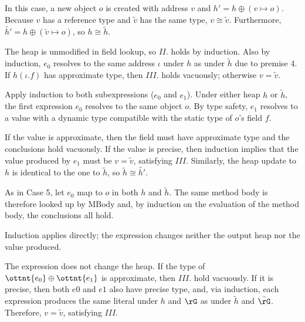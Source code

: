 In this case, a new
object $o$ is created with address $v$ and
$h' = h \oplus (v \mapsto o)$. Because $v$ has a reference type and $\tilde{v}$
has the same type, $v \cong \tilde{v}$. Furthermore,
$\tilde{h'} = h \oplus (\tilde{v} \mapsto o)$, so $h \cong \tilde{h}$.


The heap is unmodified in field lookup, so $II.$ holds by induction. Also by
induction, $e_0$ resolves to the same address $\iota$ under $h$ as under
$\tilde{h}$ due to premise 4. If $h(\iota.f)$ has approximate type,
then $III.$ holds vacuously; otherwise $v = \tilde{v}$.


Apply induction to both subexpressions ($e_0$ and $e_1$). Under either heap $h$
or $\tilde{h}$, the first expression $e_0$ resolves to the same object $o$. By
type safety, $e_1$ resolves to a value with a dynamic type compatible
with the static type of $o$'s field $f$.

If the value is approximate, then the field must have approximate type and the
conclusions hold vacuously. If the value is precise, then induction implies that
the value produced by $e_1$ must be $v = \tilde{v}$, satisfying $III.$
Similarly, the heap update to $h$ is identical to the one to $\tilde{h}$, so
$\tilde{h} \cong \tilde{h'}$.


As in Case 5, let $e_0$ map to $o$ in both $h$ and $\tilde{h}$. The same method
body is therefore looked up by $\mathrm{MBody}$ and, by induction on the
evaluation of the method body, the conclusions all hold.


Induction applies directly; the expression changes neither the output heap nor
the value produced.


The expression does not change the heap. If the type of $\ottnt{e_{{\mathrm{0}}}}  \oplus  \ottnt{e_{{\mathrm{1}}}}$ is
approximate, then $III.$ hold vacuously. If it is precise, then both $e0$ and
$e1$ also have precise type, and, via induction, each expression produces the
same literal under $h$ and $\rG$ as under $\tilde{h}$ and $\tilde{\rG}$.
Therefore, $v = \tilde{v}$, satisfying $III.$

